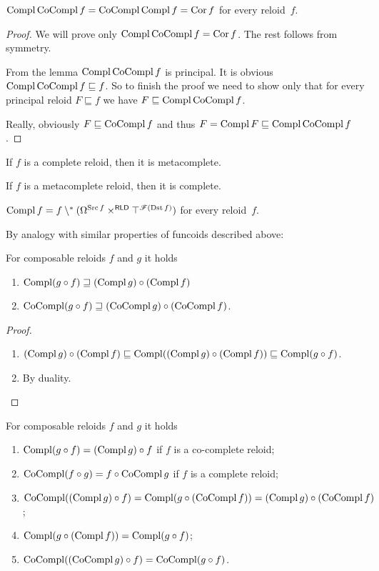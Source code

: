 \begin{thm}
$\operatorname{Compl}\operatorname{CoCompl} f=\operatorname{CoCompl}\operatorname{Compl} f=\operatorname{Cor} f$ for every reloid~$f$.\end{thm}
\begin{proof}
We will prove only $\operatorname{Compl}\operatorname{CoCompl} f=\operatorname{Cor} f$. The rest follows from
symmetry.

From the lemma $\operatorname{Compl}\operatorname{CoCompl} f$ is principal. It is obvious $\operatorname{Compl}\operatorname{CoCompl} f\sqsubseteq f$.
So to finish the proof we need to show only that for every principal
reloid $F\sqsubseteq f$ we have $F\sqsubseteq\operatorname{Compl}\operatorname{CoCompl} f$.

Really, obviously $F\sqsubseteq\operatorname{CoCompl} f$ and thus $F=\operatorname{Compl} F\sqsubseteq\operatorname{Compl}\operatorname{CoCompl} f$.\end{proof}
\begin{conjecture}
If $f$ is a complete reloid, then it is metacomplete.
\end{conjecture}

\begin{conjecture}
If $f$ is a metacomplete reloid, then it is complete.
\end{conjecture}

\begin{conjecture}
$\operatorname{Compl} f=f\setminus^{\ast}(\Omega^{\operatorname{Src} f}\times^{\mathsf{RLD}}\top^{\mathscr{F}(\operatorname{Dst} f)})$
for every reloid~$f$.
\end{conjecture}
By analogy with similar properties of funcoids described above:
\begin{prop}
For composable reloids $f$ and $g$ it holds
\begin{enumerate}
\item $\operatorname{Compl}(g\circ f)\sqsupseteq(\operatorname{Compl} g)\circ(\operatorname{Compl} f)$
\item $\operatorname{CoCompl}(g\circ f)\sqsupseteq(\operatorname{CoCompl} g)\circ(\operatorname{CoCompl} f)$.
\end{enumerate}
\end{prop}
\begin{proof}
~
\begin{enumerate}
\item $(\operatorname{Compl} g)\circ(\operatorname{Compl} f)\sqsubseteq\operatorname{Compl}((\operatorname{Compl} g)\circ(\operatorname{Compl} f))\sqsubseteq\operatorname{Compl}(g\circ f)$.
\item By duality.
\end{enumerate}
\end{proof}
\begin{conjecture}
For composable reloids $f$ and $g$ it holds
\begin{enumerate}
\item $\operatorname{Compl}(g\circ f)=(\operatorname{Compl} g)\circ f$ if $f$ is a co-complete reloid;
\item $\operatorname{CoCompl}(f\circ g)=f\circ\operatorname{CoCompl} g$ if $f$ is a complete reloid;
\item $\operatorname{CoCompl}((\operatorname{Compl} g)\circ f)=\operatorname{Compl}(g\circ(\operatorname{CoCompl} f))=(\operatorname{Compl} g)\circ(\operatorname{CoCompl} f)$;
\item $\operatorname{Compl}(g\circ(\operatorname{Compl} f))=\operatorname{Compl}(g\circ f)$;
\item $\operatorname{CoCompl}((\operatorname{CoCompl} g)\circ f)=\operatorname{CoCompl}(g\circ f)$.
\end{enumerate}
\end{conjecture}

